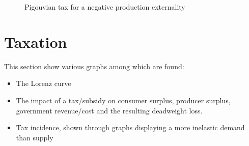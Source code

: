\documentclass[english]{article}
\begin{document}
\begin{figure}[H]
\begin{center}
\end{center}
\caption[Pigouvian tax]{Pigouvian tax for a negative production externality}
\end{figure}
	
\section{Taxation}
This section show various graphs among which are found:
\begin{itemize}
\item The Lorenz curve
\item The impact of a tax/subsidy on consumer surplus, producer surplus, government revenue/cost and the resulting deadweight loss.
\item Tax incidence, shown through graphs displaying a more inelastic demand than supply
\end{itemize}
	
%		
	
\end{document}
